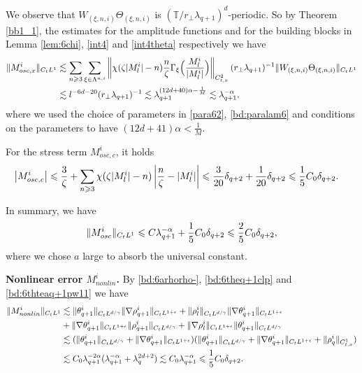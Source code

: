 \documentclass[UTF-8,reqno]{amsart}
\numberwithin{equation}{section}
\theoremstyle{definition}
\def\({{\Big(}}
\def\){{\Big)}}
\newcommand{\norm}[1]{\left\|#1\right\|}
\def\geq{\geqslant}
\def\leq{\leqslant}
\def\({{\Big(}}
\def\){{\Big)}}
\def\geq{\geqslant}
\def\leq{\leqslant}
\begin{document}
We observe that $W_{(\xi,n,i)}\Theta_{(\xi,n,i)}$ is $(\mathbb{T}/r_\perp\lambda_{q+1})^d$-periodic. So by  Theorem \ref{bb1_1},  the estimates for the amplitude functions and for the building blocks  in Lemma \ref{lem:6chi}, \eqref{int4} and \eqref{int4theta} respectively    we have
\begin{align}
\|M^{i}_{osc,x} \|_{C_tL^1}
&\lesssim\sum_{n\geq3}\sum_{\xi\in\Lambda^{n,i}}\norm{\chi(\zeta|M^{i}_l|-n)\frac{n}{\zeta}\Gamma_{\xi}\(\frac{M^{i}_l}{|M^{i}_l|}\)}_{C_{t,x}^2} (r_\perp\lambda_{q+1})^{-1}\|W_{(\xi,n,i)}\Theta_{(\xi,n,i)}\|_{C_tL^{1}} \notag\\
&\lesssim l^{-6d-20}(r_\perp\lambda_{q+1})^{-1}\lesssim \lambda_{q+1}^{(12d+40)\alpha-\frac{1}{M}}
\lesssim  \lambda_{q+1}^{-\alpha}, \notag
\end{align}
where we used the choice of parameters in \eqref{para62}, \eqref{bd:paralam6} and  conditions on the parameters to have $(12d+41)\alpha<\frac{1}{M} $.

For the stress term $M^{i}_{osc,c}$, it holds
\begin{align}
     \left| M_{osc,c}^i\right|%
     &\leq \frac{3}{\zeta}+\sum_{n\geq3}\chi(\zeta|M_l^i|-n)\left|\frac{n}{\zeta}- |M_l^i|\right|\leq \frac{3}{20}\delta_{q+2}+\frac{1}{20}\delta_{q+2}
     \leq \frac15C_0 \delta_{q+2}.\notag
\end{align}
 

In summary, we have
\begin{align}
    \|M^{i}_{osc}\|_{C_tL^1} \leq C \lambda_{q+1}^{-\alpha}+ \frac15C_0 \delta_{q+2}\leq \frac{2}{5}C_0 \delta_{q+2},\notag
\end{align}
where we chose $a$ large to absorb the universal constant.

\textbf{Nonlinear error $M_{nonlin}^i$.} 
 By \eqref{bd:6arhorho-},  
  \eqref{bd:6theq+1clp} and \eqref{bd:6thteaq+1pw11} we have 
\begin{align*}
    \|M^i_{nonlin}\|_{C_tL^1} 
     &\lesssim \| \theta_{q+1}^i \|_{C_tL^{d/\gamma}}\|\nabla\rho_{q+1}^i\|_{C_tL^{1+\epsilon}}+\| \rho_l^i\|_{C_tL^{d/\gamma}}\|\nabla \theta_{q+1}^i\|_{C_tL^{1+\epsilon}}\\
     &+\|  \nabla \theta_{q+1}^i\|_{C_tL^{1+\epsilon}}\|\rho_{q+1}^i\|_{C_tL^{d/\gamma}}+\|  \nabla\rho_l^i\|_{C_tL^{1+\epsilon}}\|\theta_{q+1}^i\|_{C_tL^{d/\gamma}}\\
     &\lesssim (\| \theta_{q+1}^i \|_{C_tL^{d/\gamma}}+\|  \nabla \theta_{q+1}^i\|_{C_tL^{1+\epsilon}})(\| \theta_{q+1}^i \|_{C_tL^{d/\gamma}}+\|  \nabla \theta_{q+1}^i\|_{C_tL^{1+\epsilon}}+\| \rho_q^i\|_{C_{t,x}^1}) \\
     &\lesssim C_0\lambda_{q+1}^{-2\alpha}(\lambda_{q+1}^{-\alpha}+\lambda_q^{2d+2})\lesssim    C_0 \lambda_{q+1}^{-\alpha}\leq \frac{1}{5}C_0 \delta_{q+2}.\notag
\end{align*}
\end{document}
